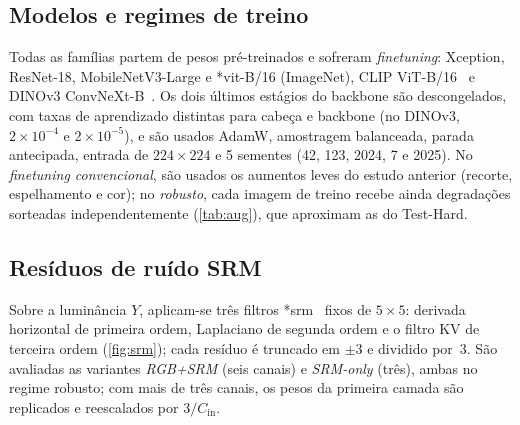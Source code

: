 \documentclass[10pt,conference]{IEEEtran}
\makeatletter
\newcommand{\acr@use}[2]{%
  \@ifundefined{acr@short@#1}{\textbf{??#1??}}{%
    \@ifundefined{acr@used@#1}{%
      \ifnum#2=0 \csname acr@long@#1\endcsname\else\csname acr@longpl@#1\endcsname\fi
      ~(\csname acr@short@#1\endcsname\ifnum#2=1 s\fi)%
      \expandafter\gdef\csname acr@used@#1\endcsname{}%
    }{%
      \csname acr@short@#1\endcsname\ifnum#2=1 s\fi
    }}%
}
\DeclareRobustCommand{\gls}{\@ifstar{\acr@use@s}{\acr@use@s}}
\newcommand{\acr@use@s}[1]{\acr@use{#1}{0}}
\makeatother
\begin{document}
\subsection{Modelos e regimes de treino}

Todas as famílias partem de pesos pré-treinados e sofreram \textit{finetuning}: Xception, ResNet-18, MobileNetV3-Large e \gls*{vit}-B/16 (ImageNet), CLIP ViT-B/16~\cite{ref_clip} e DINOv3 ConvNeXt-B~\cite{simeoni2025dinov3,liu2022convnet}.
Os dois últimos estágios do backbone são descongelados, com taxas de aprendizado distintas para cabeça e backbone (no DINOv3, $2\times10^{-4}$ e $2\times10^{-5}$), e são usados AdamW, amostragem balanceada, parada antecipada, entrada de $224\times224$ e 5 sementes (42, 123, 2024, 7 e 2025).
No \emph{\textit{finetuning} convencional}, são usados os aumentos leves do estudo anterior (recorte, espelhamento e cor); no \emph{robusto}, cada imagem de treino recebe ainda degradações sorteadas independentemente (\cref{tab:aug}), que aproximam as do Test-Hard.

\begin{table}[!htb]
\centering
\caption{Degradações do treino robusto e suas probabilidades.}
\label{tab:aug}
\vspace{-2mm}
\end{table}

\subsection{Resíduos de ruído SRM}

Sobre a luminância $Y$, aplicam-se três filtros \gls*{srm}~\cite{fridrich2012rich} fixos de $5\times5$: derivada horizontal de primeira ordem, Laplaciano de segunda ordem e o filtro KV de terceira ordem (\cref{fig:srm}); cada resíduo é truncado em $\pm3$ e dividido por~3.
São avaliadas as variantes \textit{RGB+SRM} (seis canais) e \textit{SRM-only} (três), ambas no regime robusto; com mais de três canais, os pesos da primeira camada são replicados e reescalados por $3/C_{\text{in}}$.
\end{document}
